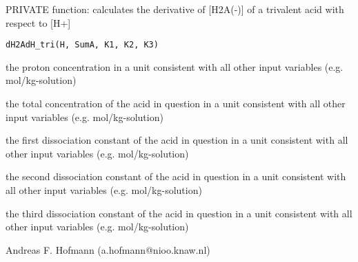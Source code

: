 \documentclass{article}
\begin{document}
\begin{Description}\relax
PRIVATE function: calculates the derivative of [H2A(-)] of a trivalent acid with respect to [H+]
\end{Description}
\begin{Usage}
\begin{verbatim}dH2AdH_tri(H, SumA, K1, K2, K3)\end{verbatim}
\end{Usage}
\begin{Arguments}
\begin{ldescription}
\item[\code{H }] the proton concentration in a unit consistent with all other input variables (e.g. mol/kg-solution)
\item[\code{SumA }] the total concentration of the acid in question in a unit consistent with all other input variables (e.g. mol/kg-solution)
\item[\code{K1 }] the first dissociation constant of the acid in question in a unit consistent with all other input variables (e.g. mol/kg-solution)
\item[\code{K2 }] the second dissociation constant of the acid in question in a unit consistent with all other input variables (e.g. mol/kg-solution)
\item[\code{K3 }] the third dissociation constant of the acid in question in a unit consistent with all other input variables (e.g. mol/kg-solution)
\end{ldescription}
\end{Arguments}
\begin{Author}\relax
Andreas F. Hofmann (a.hofmann@nioo.knaw.nl)
\end{Author}
\end{document}
